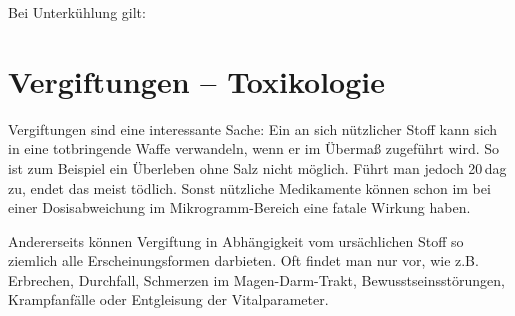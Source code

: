 


Bei Unterkühlung gilt:



\clearpage
\section{Vergiftungen -- Toxikologie}



Vergiftungen sind eine interessante Sache: Ein an sich
nützlicher Stoff kann sich in eine totbringende Waffe
verwandeln, wenn er im Übermaß zugeführt wird. So ist zum
Beispiel ein Überleben ohne Salz nicht möglich. Führt man
jedoch 20\,dag zu, endet das meist tödlich. Sonst nützliche
Medikamente können schon im bei einer Dosisabweichung im
Mikrogramm-Bereich eine fatale Wirkung haben.

Andererseits können Vergiftung in Abhängigkeit vom ursächlichen Stoff so
ziemlich alle Erscheinungsformen darbieten. Oft findet man
nur  vor, wie z.B. Erbrechen,
Durchfall, Schmerzen im Magen-Darm-Trakt,
Bewusstseinsstörungen, Krampfanfälle oder Entgleisung der
Vitalparameter.

